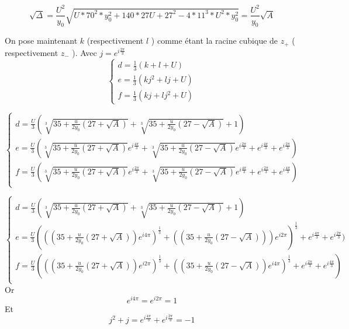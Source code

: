 \documentclass[12pt]{article}
\begin{document}
\begin{equation}
 \sqrt{\Delta} = \frac{U^2}{y_0} \sqrt{U*70^2*y_0^2+ 140*27U+27^2 -4*11^3*U^2*y_0^2} = \frac{U^2}{y_0} \sqrt{A}
\end{equation}

On pose maintenant $k$ (respectivement $l$ ) comme \'etant la racine cubique de $z_+$ ( respectivement $z_-$ ).
 Avec $j = e^{i\frac{2\pi}{3}}$
\begin{equation}
\left\{ \begin{array}{rl}
d = \frac{1}{3} ( k + l + U)\\
e = \frac{1}{3} (kj^2 + lj + U)\\
f = \frac{1}{3} (kj + lj^2 + U)
\end{array} \right.
\end{equation} 


\begin{equation}
\left\{ \begin{array}{rl}
d = \frac{U}{3} ( \sqrt[3]{35+\frac{u}{2y_0}(27 + \sqrt{A})}+\sqrt[3]{35+\frac{u}{2y_0}(27 - \sqrt{A})} + 1)\\
e = \frac{U}{3} (\sqrt[3]{35+\frac{u}{2y_0}(27 + \sqrt{A})} e^{i\frac{4\pi}{3}}  +   \sqrt[3]{35+\frac{u}{2y_0}(27 - \sqrt{A})}e^{i \frac{2\pi}{3}} 
+ e^{i\frac{4\pi}{3}} + e^{i\frac{2\pi}{3}} )\\
f = \frac{U}{3} (\sqrt[3]{35+\frac{u}{2y_0}(27 + \sqrt{A})} e^{i\frac{2\pi}{3}}  +   \sqrt[3]{35+\frac{u}{2y_0}(27 - \sqrt{A})}e^{i \frac{4\pi}{3}} 
+ e^{i\frac{2\pi}{3}} + e^{i\frac{4\pi}{3}} )\\
\end{array} \right.
\end{equation}


\begin{equation}
\left\{ \begin{array}{rl}
d = \frac{U}{3} ( \sqrt[3]{35+\frac{u}{2y_0}(27 + \sqrt{A})}+\sqrt[3]{35+\frac{u}{2y_0}(27 - \sqrt{A})} + 1)\\
e = \frac{U}{3} (((35+\frac{u}{2y_0}(27 + \sqrt{A})) e^{i4\pi})^{\frac{1}{3}} + ((35+\frac{u}{2y_0}(27 - \sqrt{A})))e^{i 2\pi})^{\frac{1}{3}}
+ e^{i\frac{4\pi}{3}} + e^{i\frac{2\pi}{3}} )\\
f = \frac{U}{3} (((35+\frac{u}{2y_0}(27 + \sqrt{A})) e^{i2\pi})^{\frac{1}{3}} + ((35+\frac{u}{2y_0}(27 - \sqrt{A}))e^{i 4\pi})^{\frac{1}{3}} 
+ e^{i\frac{2\pi}{3}} + e^{i\frac{4\pi}{3}} )\\
\end{array} \right.
\end{equation}
Or
\begin{equation}
 e^{i4\pi} = e^{i2\pi} = 1
\end{equation}
Et
\begin{equation}
 j^2+j= e^{i\frac{4\pi}{3}} + e^{i\frac{2\pi}{3}} = -1
\end{equation}
\end{document}
